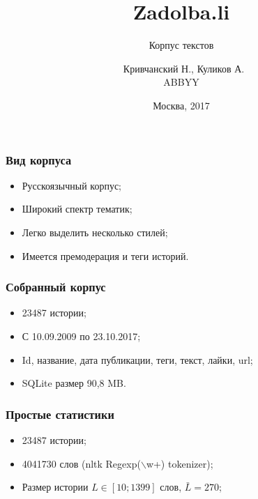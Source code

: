 \documentclass[14pt]{beamer}
\title{Zadolba.li}
\subtitle{\footnotesize{Корпус текстов}}
\author{\small{%
		~Кривчанский Н., Куликов А.}\\%
	\vspace{30pt}%
	ABBYY%
	\vspace{20pt}%
}
\date{\small{Москва, 2017}}
\begin{document}
	
	\maketitle

\begin{frame}[fragile]
	
	\frametitle{Вид корпуса}
	
	\begin{itemize}
		\item Русскоязычный корпус;
		\item Широкий спектр тематик;
		\item Легко выделить несколько стилей;
		\item Имеется премодерация и теги историй.
	\end{itemize}

\end{frame}

\begin{frame}[fragile]
	
	\frametitle{Собранный корпус}
	
	\begin{itemize}
		\item 23487 истории;
		\item С 10.09.2009 по 23.10.2017;
		\item Id, название, дата публикации, теги, текст, лайки, url;
		\item SQLite размер 90,8 MB.
	\end{itemize}
	
\end{frame}

\begin{frame}[fragile]
	
	\frametitle{Простые статистики}
	
	\begin{itemize}
		\item 23487 истории;
		\item 4041730 слов (nltk Regexp($\backslash$w+) tokenizer);
		\item Размер истории $L \in [10; 1399]$ слов, $\bar L = 270$;
	\end{itemize}
	
\end{frame}
\end{document}
